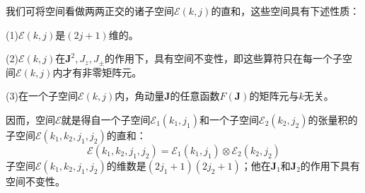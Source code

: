 \documentclass[]{article}
\begin{document}
我们可将空间看做两两正交的诸子空间$\mathscr{E}(k,j)$的直和，这些空间具有下述性质：\par 
(1)$\mathscr{E}(k,j)$是$(2j+1)$维的。\par 
(2)$\mathscr{E}(k,j)$在$\boldsymbol{J}^2,J_z,J_\pm$的作用下，具有空间不变性，即这些算符只在每一个子空间$\mathscr{E}(k,j)$内才有非零矩阵元。\par 
(3)在一个子空间$\mathscr{E}(k,j)$内，角动量$\boldsymbol{J}$的任意函数$F(\boldsymbol{J})$的矩阵元与$k$无关。

因而，空间$\mathscr{E}$就是得自一个子空间$\mathscr{E}_1(k_1,j_1)$和一个子空间$\mathscr{E}_2(k_2,j_2)$的张量积的子空间$\mathscr{E}(k_1,k_2,j_1,j_2)$的直和：
\begin{equation}
	\mathscr{E}(k_1,k_2,j_1,j_2)=\mathscr{E}_1(k_1,j_1)\otimes\mathscr{E}_2(k_2,j_2)
	\label{c11c11}
\end{equation}
子空间$\mathscr{E}(k_1,k_2,j_1,j_2)$的维数是$(2j_1+1)(2j_2+1)$；他在$\boldsymbol{J}_1$和$\boldsymbol{J}_2$的作用下具有空间不变性。
\end{document}
